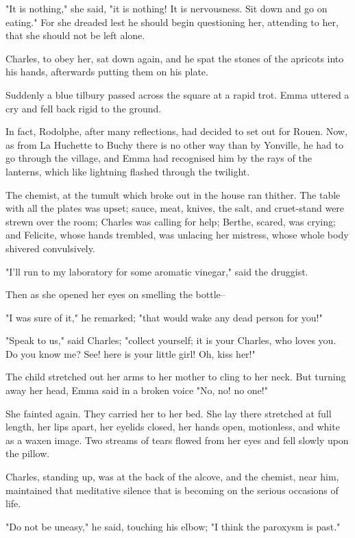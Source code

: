 \documentclass[11pt,twocolumn]{ltugboat}
\begin{document}
"It is nothing," she said, "it is nothing! It is nervousness. Sit down
and go on eating." For she dreaded lest he should begin questioning her,
attending to her, that she should not be left alone.

Charles, to obey her, sat down again, and he spat the stones of the
apricots into his hands, afterwards putting them on his plate.

Suddenly a blue tilbury passed across the square at a rapid trot. Emma
uttered a cry and fell back rigid to the ground.

In fact, Rodolphe, after many reflections, had decided to set out for
Rouen. Now, as from La Huchette to Buchy there is no other way than by
Yonville, he had to go through the village, and Emma had recognised him
by the rays of the lanterns, which like lightning flashed through the
twilight.

The chemist, at the tumult which broke out in the house ran thither. The
table with all the plates was upset; sauce, meat, knives, the salt, and
cruet-stand were strewn over the room; Charles was calling for help;
Berthe, scared, was crying; and Felicite, whose hands trembled, was
unlacing her mistress, whose whole body shivered convulsively.

"I'll run to my laboratory for some aromatic vinegar," said the
druggist.

Then as she opened her eyes on smelling the bottle--

"I was sure of it," he remarked; "that would wake any dead person for
you!"

"Speak to us," said Charles; "collect yourself; it is your Charles, who
loves you. Do you know me? See! here is your little girl! Oh, kiss her!"

The child stretched out her arms to her mother to cling to her neck. But
turning away her head, Emma said in a broken voice "No, no! no one!"

She fainted again. They carried her to her bed. She lay there stretched
at full length, her lips apart, her eyelids closed, her hands open,
motionless, and white as a waxen image. Two streams of tears flowed from
her eyes and fell slowly upon the pillow.

Charles, standing up, was at the back of the alcove, and the chemist,
near him, maintained that meditative silence that is becoming on the
serious occasions of life.

"Do not be uneasy," he said, touching his elbow; "I think the paroxysm
is past."
\end{document}
